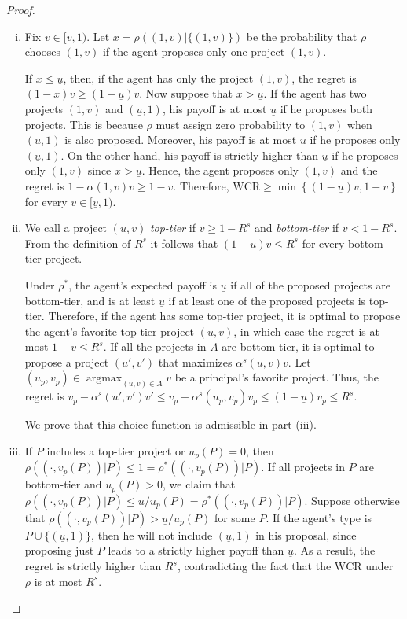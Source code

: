 \documentclass[12pt,english]{article}
\newcommand{\under}{\underline}
\DeclareMathOperator*{\argmax}{argmax}
\newcommand{\underu}{{\underline{u}}}
\theoremstyle{remark}
\theoremstyle{plain}
\theoremstyle{definition}
\newcommand{\wcr}{\mathrm{WCR}}
\begin{document}
\begin{proof}
\begin{enumerate}[(i)]
\vspace{-0.35cm} \item Fix $v\in [\under v,1)$. Let $x=\rho((1,v)|\{(1,v)\})$ be the probability that $\rho$ chooses $(1,v)$ if the agent proposes only one project $(1,v)$. 

If $x \leqslant \under u$, then, if the agent has only the project $(1,v)$, the regret is $(1-x)v\geqslant (1-\under u)v$. Now suppose that $x> \under u$. If the agent has two projects $(1,v)$ and $(\under u,1)$, his payoff is at most $\under u$ if he proposes both projects. This is because $\rho$ must assign zero probability to $(1,v)$ when $(\under u,1)$ is also proposed. Moreover, his payoff is at most $\under u$ if he proposes only $(\under u,1)$. On the other hand, his payoff is strictly higher than $\under u$ if he proposes only $(1,v)$ since $x>\under u$. Hence, the agent proposes only $(1,v)$ and the regret is $1-\alpha(1,v)v\geqslant 1-v$. Therefore, $\wcr\geqslant \min\left\{(1-\under u)v, 1-v\right\}$ for every $v\in [\under v,1)$.	
\vspace{-0.35cm} \item  We call a project $(u,v)$ \emph{top-tier} if $v\geqslant 1-R^s$ and \emph{bottom-tier} if $v<1-R^s$. From the definition of $R^s$ it follows that $(1-\under u)v \leqslant R^s$ for every bottom-tier project. 

Under $\rho^\ast$, the agent's expected payoff is $\underu$ if all of the proposed projects are bottom-tier, and is at least $\underu $ if at least one of the proposed projects is top-tier. Therefore, if the agent has some top-tier project, it is optimal to propose the agent's favorite top-tier project $(u,v)$, in which case the regret is at most $1-v\leqslant R^s$. If all the projects in $A$ are bottom-tier, it is optimal to propose a project $(u',v')$ that maximizes $\alpha^s(u,v)v$. Let $(u_p,v_p)\in \argmax_{(u,v)\in A} v$ be a principal's favorite project. Thus, the regret is $v_p- \alpha^s(u',v')v' \leqslant v_p-\alpha^s(u_p,v_p)v_p \leqslant (1-\underu)v_p\leqslant R^s$.  
      
     We prove that this choice function is admissible in part (iii).  
     
    \vspace{-0.35cm} \item If $P$ includes a top-tier project or $u_p(P)=0$, then $\rho((\cdot,v_p(P))|P) \leqslant 1=\rho^\ast((\cdot,v_p(P))|P)$. If all projects in $P$ are bottom-tier and $u_p(P)>0$, we claim that $\rho((\cdot,v_p(P))|P)\leqslant  \underu /u_p(P)=\rho^\ast((\cdot,v_p(P))|P)$. Suppose otherwise that $\rho((\cdot,v_p(P))|P)> \underu /u_p(P)$ for some $P$. If the agent's type is $P \cup \{(\underu, 1)\}$, then he will not include $(\underu, 1)$ in his proposal, since proposing just $P$ leads to a strictly higher payoff than $\underu$. As a result, the regret is strictly higher than $R^s$, contradicting the fact that the $\wcr$ under $\rho$ is at most $R^s$.  


\end{enumerate}
\end{proof}
\end{document}
